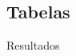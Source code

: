 \documentclass[
	12pt,				%
	openright,			%
	oneside,			%
	a4paper,			%
	english,			%
	brazil				%
	]{dissertacao-ufrgs-abntex2}
\begin{document}
\begin{apendicesenv}
%
\partapendices
%



\chapter{Tabelas} \label{tabelas-resultados}

Resultados

%
%
%
%
%
%
%
%
%
%
%
%

\end{apendicesenv}
\end{document}
